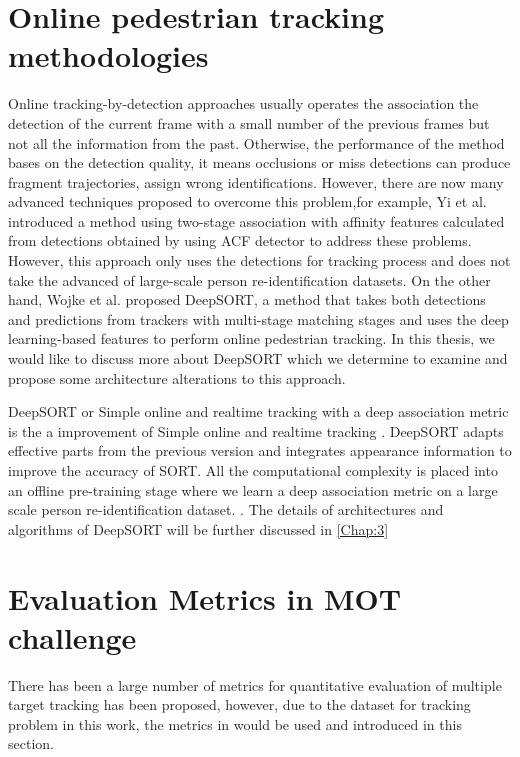 \section{Online pedestrian tracking methodologies}
\hspace{0.45cm} Online tracking-by-detection approaches usually operates the association the
detection of the current frame with a small number of the previous frames but not all the
information from the past. Otherwise, the performance of the method bases on the detection quality,
it means occlusions or miss detections can produce fragment trajectories, assign wrong
identifications. However, there are now many advanced techniques proposed to overcome this
problem,for example, Yi et al. \cite{MultiTracking} introduced a method using two-stage association with affinity features
calculated from detections obtained by using ACF detector to address these problems. However, this approach
only uses the detections for tracking process and does not take the advanced of large-scale person re-identification datasets.
On the other hand, Wojke et al. \cite{Wojke2017simple} proposed DeepSORT, a method that takes both detections and predictions 
from trackers with multi-stage matching stages and uses the deep learning-based features to perform online pedestrian tracking.
In this thesis, we would like to discuss more about DeepSORT\cite{Wojke2017simple} which we determine to examine and propose some architecture alterations to this approach.\par

DeepSORT or Simple online and realtime tracking with a deep association metric \cite{Wojke2017simple} is 
the a improvement of Simple online and realtime tracking \cite{sort} . DeepSORT\cite{Wojke2017simple} adapts effective parts from the previous version and integrates appearance information to improve the accuracy of SORT. All the computational complexity is placed 
into an offline pre-training stage where we learn a deep association metric on a large scale person re-identification dataset. \cite{Wojke2017simple}. The details of architectures
and algorithms of DeepSORT\cite{Wojke2017simple} will be further discussed in \autoref{Chap:3}





\section{Evaluation Metrics in MOT challenge}
\hspace{0.45cm}There has been a large number of metrics for quantitative evaluation of multiple target tracking has been proposed, however, due to the dataset for tracking problem in this work, the metrics in \cite{Milan2016MOT16AB} would be used and introduced in this section.
